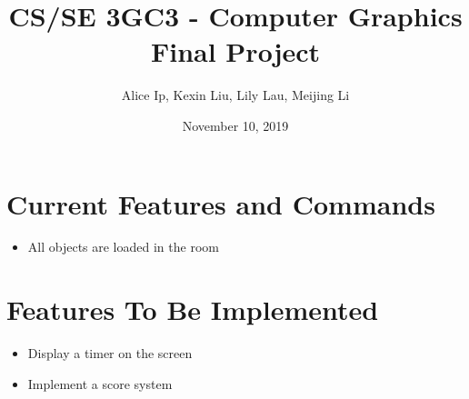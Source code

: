 \documentclass[11pt]{article}
\author{Alice Ip, Kexin Liu, Lily Lau, Meijing Li}
\date{November 10, 2019}
\title{CS/SE 3GC3 - Computer Graphics Final Project}
\begin{document}
\maketitle

\section*{Current Features and Commands}
\label{sec:org2d3e8d3}
\begin{itemize}
\item All objects are loaded in the room
\end{itemize}

\section*{Features To Be Implemented}
\label{sec:orgebb1e96}
\begin{itemize}
\item Display a timer on the screen
\item Implement a score system
\end{itemize}
\end{document}
